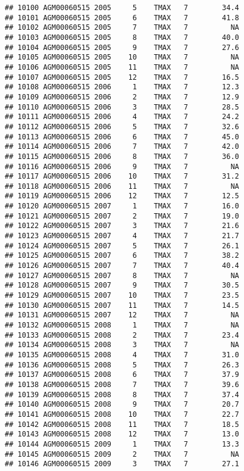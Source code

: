 \documentclass{article}\usepackage[]{graphicx}\usepackage[]{color}
\makeatletter
\newenvironment{kframe}{%
 \def\at@end@of@kframe{}%
 \ifinner\ifhmode%
  \def\at@end@of@kframe{\end{minipage}}%
  \begin{minipage}{\columnwidth}%
 \fi\fi%
 \def\FrameCommand##1{\hskip\@totalleftmargin \hskip-\fboxsep
 \colorbox{shadecolor}{##1}\hskip-\fboxsep
     \hskip-\linewidth \hskip-\@totalleftmargin \hskip\columnwidth}%
 \MakeFramed {\advance\hsize-\width
   \@totalleftmargin\z@ \linewidth\hsize
   \@setminipage}}%
 {\par\unskip\endMakeFramed%
 \at@end@of@kframe}
\newenvironment{knitrout}{}{} %
\makeatother
\begin{document}
\begin{knitrout}
\begin{kframe}
\begin{verbatim}
## 10100 AGM00060515 2005     5    TMAX   7        34.4
## 10101 AGM00060515 2005     6    TMAX   7        41.8
## 10102 AGM00060515 2005     7    TMAX   7          NA
## 10103 AGM00060515 2005     8    TMAX   7        40.0
## 10104 AGM00060515 2005     9    TMAX   7        27.6
## 10105 AGM00060515 2005    10    TMAX   7          NA
## 10106 AGM00060515 2005    11    TMAX   7          NA
## 10107 AGM00060515 2005    12    TMAX   7        16.5
## 10108 AGM00060515 2006     1    TMAX   7        12.3
## 10109 AGM00060515 2006     2    TMAX   7        12.9
## 10110 AGM00060515 2006     3    TMAX   7        28.5
## 10111 AGM00060515 2006     4    TMAX   7        24.2
## 10112 AGM00060515 2006     5    TMAX   7        32.6
## 10113 AGM00060515 2006     6    TMAX   7        45.0
## 10114 AGM00060515 2006     7    TMAX   7        42.0
## 10115 AGM00060515 2006     8    TMAX   7        36.0
## 10116 AGM00060515 2006     9    TMAX   7          NA
## 10117 AGM00060515 2006    10    TMAX   7        31.2
## 10118 AGM00060515 2006    11    TMAX   7          NA
## 10119 AGM00060515 2006    12    TMAX   7        12.5
## 10120 AGM00060515 2007     1    TMAX   7        16.0
## 10121 AGM00060515 2007     2    TMAX   7        19.0
## 10122 AGM00060515 2007     3    TMAX   7        21.6
## 10123 AGM00060515 2007     4    TMAX   7        21.7
## 10124 AGM00060515 2007     5    TMAX   7        26.1
## 10125 AGM00060515 2007     6    TMAX   7        38.2
## 10126 AGM00060515 2007     7    TMAX   7        40.4
## 10127 AGM00060515 2007     8    TMAX   7          NA
## 10128 AGM00060515 2007     9    TMAX   7        30.5
## 10129 AGM00060515 2007    10    TMAX   7        23.5
## 10130 AGM00060515 2007    11    TMAX   7        14.5
## 10131 AGM00060515 2007    12    TMAX   7          NA
## 10132 AGM00060515 2008     1    TMAX   7          NA
## 10133 AGM00060515 2008     2    TMAX   7        23.4
## 10134 AGM00060515 2008     3    TMAX   7          NA
## 10135 AGM00060515 2008     4    TMAX   7        31.0
## 10136 AGM00060515 2008     5    TMAX   7        26.3
## 10137 AGM00060515 2008     6    TMAX   7        37.9
## 10138 AGM00060515 2008     7    TMAX   7        39.6
## 10139 AGM00060515 2008     8    TMAX   7        37.4
## 10140 AGM00060515 2008     9    TMAX   7        20.7
## 10141 AGM00060515 2008    10    TMAX   7        22.7
## 10142 AGM00060515 2008    11    TMAX   7        18.5
## 10143 AGM00060515 2008    12    TMAX   7        13.0
## 10144 AGM00060515 2009     1    TMAX   7        13.3
## 10145 AGM00060515 2009     2    TMAX   7          NA
## 10146 AGM00060515 2009     3    TMAX   7        27.1

\end{verbatim}
\end{kframe}
\end{knitrout}
\end{document}
